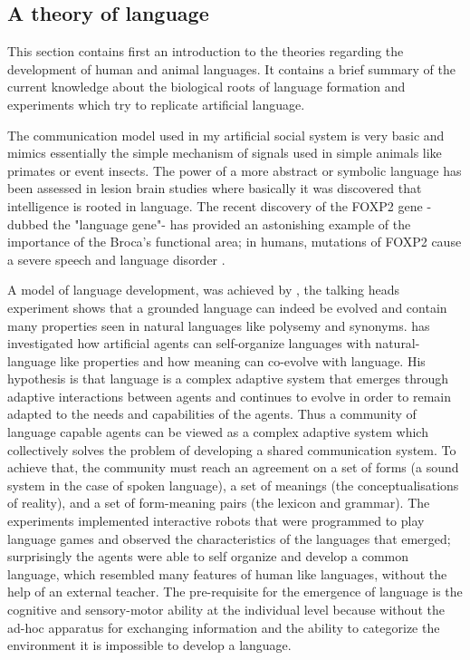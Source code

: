 \subsection{A theory of language \label{Conclusion:Language}}

This section contains first an introduction to the theories regarding the development
of human and animal languages.
It contains a brief summary of the current knowledge about the biological
roots of language formation and experiments which try to replicate artificial
language.

The communication model used in my artificial social system is very basic and mimics essentially
the simple mechanism of signals used in simple animals like primates or event insects.
The power of a more abstract or symbolic language has been assessed in lesion brain
studies where basically it was discovered that intelligence is rooted in language.
The recent discovery of the FOXP2 gene -dubbed the "language gene"- has provided
an astonishing example of the importance of the Broca's functional area;
in humans, mutations of FOXP2 cause a severe speech and language
disorder \citep{FoxP2Gene:Nature:2001,FOXP2Identification:2005}.

A model of language development, was achieved by \citet{Steels:1998:OriginsOntologies,Steels:1999:TalkingHeads}, 
the talking heads experiment shows that a grounded language can indeed be
evolved and contain many properties seen in natural languages like polysemy and
synonyms.
\citet{Steels:1999:TalkingHeads} has investigated how artificial agents can self-organize
languages with natural-language like properties and how meaning can co-evolve
with language. His hypothesis is that language is a
complex adaptive system that emerges through adaptive interactions between
agents and continues to evolve in order to remain adapted to the needs and
capabilities of the agents.
Thus a community of language capable agents can be viewed as a complex adaptive
system which collectively solves the problem of developing a shared
communication system.
To achieve that, the community must reach an agreement on a set of forms
(a sound system in the case of spoken language), a set of meanings (the
conceptualisations of reality), and a set of form-meaning pairs (the
lexicon and grammar).
The experiments implemented interactive robots that were programmed to play language games and
observed the characteristics of the languages that emerged; surprisingly the
agents were able to self organize and develop a common language, which resembled many features of human like
languages, without the help of an external teacher. 
The pre-requisite for the emergence of language is the cognitive and
 sensory-motor ability at the individual level because without the ad-hoc apparatus for
exchanging information and the ability to categorize the environment it is impossible to develop a language.

